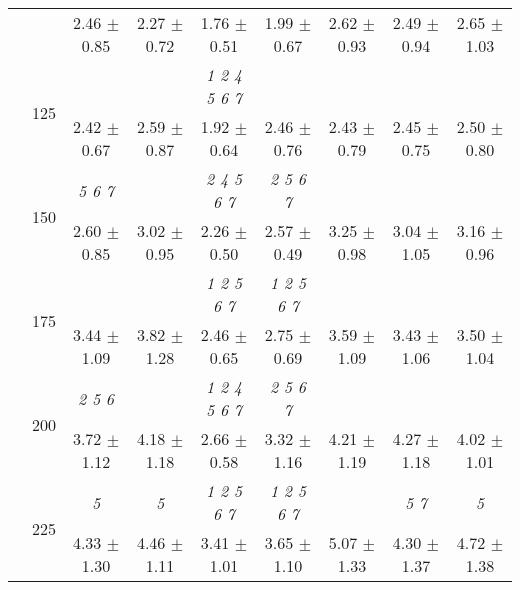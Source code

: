 \begin{table}[h]
{\begin{tabular}{
        ccccccccc}
 & & 2.46 $\pm$ 0.85& 2.27 $\pm$ 0.72& 1.76 $\pm$ 0.51& 1.99 $\pm$ 0.67& 2.62 $\pm$ 0.93& 2.49 $\pm$ 0.94& 2.65 $\pm$ 1.03 \\ 
 & \multirow{2}{*}{125}& \cellcolor[HTML]{EFEFEF} & \cellcolor[HTML]{EFEFEF} & \cellcolor[HTML]{EFEFEF} \textit{ 1 2 4 5 6 7 }& \cellcolor[HTML]{EFEFEF} & \cellcolor[HTML]{EFEFEF} & \cellcolor[HTML]{EFEFEF} & \cellcolor[HTML]{EFEFEF}  \\ 
 & & \cellcolor[HTML]{EFEFEF} 2.42 $\pm$ 0.67& \cellcolor[HTML]{EFEFEF} 2.59 $\pm$ 0.87& \cellcolor[HTML]{EFEFEF} 1.92 $\pm$ 0.64& \cellcolor[HTML]{EFEFEF} 2.46 $\pm$ 0.76& \cellcolor[HTML]{EFEFEF} 2.43 $\pm$ 0.79& \cellcolor[HTML]{EFEFEF} 2.45 $\pm$ 0.75& \cellcolor[HTML]{EFEFEF} 2.50 $\pm$ 0.80 \\ 
 & \multirow{2}{*}{150}& \textit{ 5 6 7 }& & \textit{ 2 4 5 6 7 }& \textit{ 2 5 6 7 }& & &  \\ 
 & & 2.60 $\pm$ 0.85& 3.02 $\pm$ 0.95& 2.26 $\pm$ 0.50& 2.57 $\pm$ 0.49& 3.25 $\pm$ 0.98& 3.04 $\pm$ 1.05& 3.16 $\pm$ 0.96 \\ 
 & \multirow{2}{*}{175}& \cellcolor[HTML]{EFEFEF} & \cellcolor[HTML]{EFEFEF} & \cellcolor[HTML]{EFEFEF} \textit{ 1 2 5 6 7 }& \cellcolor[HTML]{EFEFEF} \textit{ 1 2 5 6 7 }& \cellcolor[HTML]{EFEFEF} & \cellcolor[HTML]{EFEFEF} & \cellcolor[HTML]{EFEFEF}  \\ 
 & & \cellcolor[HTML]{EFEFEF} 3.44 $\pm$ 1.09& \cellcolor[HTML]{EFEFEF} 3.82 $\pm$ 1.28& \cellcolor[HTML]{EFEFEF} 2.46 $\pm$ 0.65& \cellcolor[HTML]{EFEFEF} 2.75 $\pm$ 0.69& \cellcolor[HTML]{EFEFEF} 3.59 $\pm$ 1.09& \cellcolor[HTML]{EFEFEF} 3.43 $\pm$ 1.06& \cellcolor[HTML]{EFEFEF} 3.50 $\pm$ 1.04 \\ 
 & \multirow{2}{*}{200}& \textit{ 2 5 6 }& & \textit{ 1 2 4 5 6 7 }& \textit{ 2 5 6 7 }& & &  \\ 
 & & 3.72 $\pm$ 1.12& 4.18 $\pm$ 1.18& 2.66 $\pm$ 0.58& 3.32 $\pm$ 1.16& 4.21 $\pm$ 1.19& 4.27 $\pm$ 1.18& 4.02 $\pm$ 1.01 \\ 
 & \multirow{2}{*}{225}& \cellcolor[HTML]{EFEFEF} \textit{ 5 }& \cellcolor[HTML]{EFEFEF} \textit{ 5 }& \cellcolor[HTML]{EFEFEF} \textit{ 1 2 5 6 7 }& \cellcolor[HTML]{EFEFEF} \textit{ 1 2 5 6 7 }& \cellcolor[HTML]{EFEFEF} & \cellcolor[HTML]{EFEFEF} \textit{ 5 7 }& \cellcolor[HTML]{EFEFEF} \textit{ 5 } \\ 
 & & \cellcolor[HTML]{EFEFEF} 4.33 $\pm$ 1.30& \cellcolor[HTML]{EFEFEF} 4.46 $\pm$ 1.11& \cellcolor[HTML]{EFEFEF} 3.41 $\pm$ 1.01& \cellcolor[HTML]{EFEFEF} 3.65 $\pm$ 1.10& \cellcolor[HTML]{EFEFEF} 5.07 $\pm$ 1.33& \cellcolor[HTML]{EFEFEF} 4.30 $\pm$ 1.37& \cellcolor[HTML]{EFEFEF} 4.72 $\pm$ 1.38 \\ 

\end{tabular}}
\end{table}
